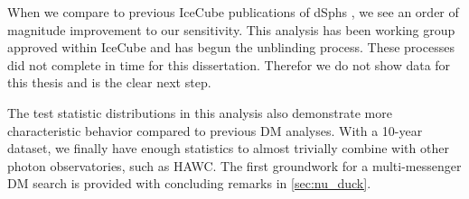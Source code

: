 When we compare to previous IceCube publications of dSphs \cite{IC3_DM2013}, we see an order of magnitude improvement to our sensitivity.
This analysis has been working group approved within IceCube and has begun the unblinding process.
These processes did not complete in time for this dissertation.
Therefor we do not show data for this thesis and is the clear next step.

The test statistic distributions in this analysis also demonstrate more characteristic behavior compared to previous DM analyses.
With a 10-year dataset, we finally have enough statistics to almost trivially combine with other photon observatories, such as HAWC.
The first groundwork for a multi-messenger DM search is provided with concluding remarks in \cref{sec:nu_duck}.